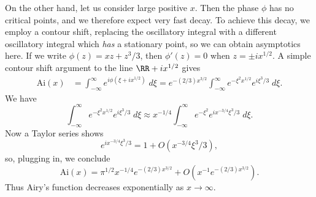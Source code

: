 \begin{example}

  On the other hand, let us consider large positive $x$. Then the phase $\phi$ has no critical points, and we therefore expect very fast decay. To achieve this decay, we employ a contour shift, replacing the oscillatory integral with a different oscillatory integral which \emph{has} a stationary point, so we can obtain asymptotics here. If we write $\phi(z) = xz + z^3/3$, then $\phi'(z) = 0$ when $z = \pm i x^{1/2}$. A simple contour shift argument to the line $\RR + i x^{1/2}$ gives
  \begin{align*}
    \text{Ai}(x) &= \int_{-\infty}^\infty e^{i \phi(\xi + ix^{1/2})}\; d\xi = e^{- (2/3) x^{3/2}} \int_{-\infty}^\infty e^{- \xi^2 x^{1/2}} e^{i \xi^3 / 3} \; d\xi.
  \end{align*}
  We have
  \[ \int_{-\infty}^\infty e^{- \xi^2 x^{1/2}} e^{i \xi^3/3}\; d\xi \approx x^{-1/4} \int_{-\infty}^\infty e^{- \xi^2} e^{i x^{-3/4} \xi^3/3}\; d\xi. \]
  Now a Taylor series shows
  \[ e^{i x^{-3/4} \xi^3/3} = 1 + O(x^{-3/4} \xi^3/3), \]
  so, plugging in, we conclude
  \[ \text{Ai}(x) = \pi^{1/2} x^{-1/4} e^{-(2/3) x^{3/2}} + O(x^{-1} e^{-(2/3) x^{3/2}}). \]
  Thus Airy's function decreases exponentially as $x \to \infty$.
\end{example}


